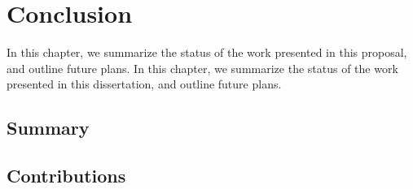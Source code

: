 \chapter{Conclusion\label{chap:conclusion}}

\if@ms
In this chapter, we summarize the status of the work presented in this proposal, and outline future plans.
\else
In this chapter, we summarize the status of the work presented in this dissertation, and outline future plans.
\fi

\section{Summary\label{sec:conclusion:summary}}

\lipsum{}

\section{Contributions\label{sec:conclusion:contributions}}

\lipsum{}

